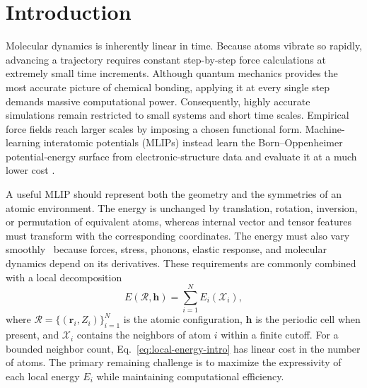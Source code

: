 \documentclass[aps,prx,preprint,notitlepage,superscriptaddress,nofootinbib,floatfix]{revtex4-2}
\newcommand{\vect}[1]{\bm{#1}}
\begin{document}
%

\newpage

\section{Introduction}
Molecular dynamics is inherently linear in time. Because atoms vibrate so rapidly, advancing a trajectory requires constant step-by-step force calculations at extremely small time increments. Although quantum mechanics provides the most accurate picture of chemical bonding, applying it at every single step demands massive computational power. Consequently, highly accurate simulations remain restricted to small systems and short time scales. Empirical force fields reach larger scales by imposing a chosen functional form. Machine-learning interatomic potentials (MLIPs) instead learn the Born--Oppenheimer potential-energy surface from electronic-structure data and evaluate it at a much lower cost \cite{behler2007,bartok2010,thompson2015,shapeev2016}.

A useful MLIP should represent both the geometry and the symmetries of an atomic environment. The energy is unchanged by translation, rotation, inversion, or permutation of equivalent atoms, whereas internal vector and tensor features must transform with the corresponding coordinates. The energy must also vary smoothly~\cite{pota2024thermal} because forces, stress, phonons, elastic response, and molecular dynamics depend on its derivatives. These requirements are commonly combined with a local decomposition
\begin{equation}
 E(\mathcal R,\vect h)=\sum_{i=1}^{N}E_i(\mathcal X_i),
 \label{eq:local-energy-intro}
\end{equation}
where $\mathcal R=\{(\vect r_i,Z_i)\}_{i=1}^{N}$ is the atomic
configuration, $\vect h$ is the periodic cell when present, and $\mathcal X_i$ contains the neighbors of atom $i$ within a finite cutoff. For a bounded neighbor count, Eq.~\eqref{eq:local-energy-intro} has linear cost in the number of atoms. The primary remaining challenge is to maximize the expressivity of each local energy $E_i$ while maintaining computational efficiency. 
\end{document}
